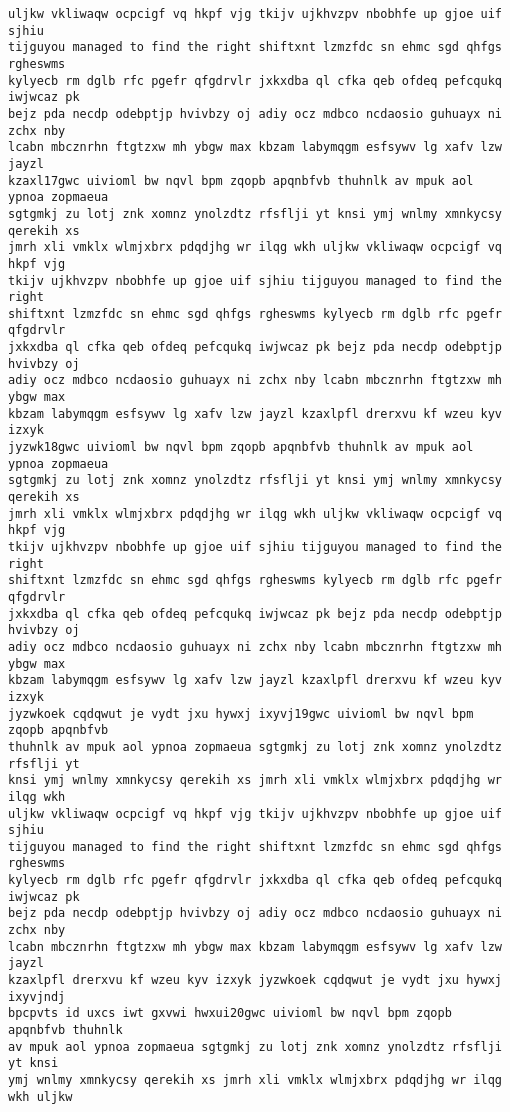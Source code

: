 \documentclass[11pt]{article}
\begin{document}
\begin{tcolorbox}[breakable, size=fbox, boxrule=.5pt, pad at break*=1mm, opacityfill=0]
\begin{Verbatim}[commandchars=\\\{\}]
uljkw vkliwaqw ocpcigf vq hkpf vjg tkijv ujkhvzpv nbobhfe up gjoe uif sjhiu
tijguyou managed to find the right shiftxnt lzmzfdc sn ehmc sgd qhfgs rgheswms
kylyecb rm dglb rfc pgefr qfgdrvlr jxkxdba ql cfka qeb ofdeq pefcqukq iwjwcaz pk
bejz pda necdp odebptjp hvivbzy oj adiy ocz mdbco ncdaosio guhuayx ni zchx nby
lcabn mbcznrhn ftgtzxw mh ybgw max kbzam labymqgm esfsywv lg xafv lzw jayzl
kzaxl17gwc uivioml bw nqvl bpm zqopb apqnbfvb thuhnlk av mpuk aol ypnoa zopmaeua
sgtgmkj zu lotj znk xomnz ynolzdtz rfsflji yt knsi ymj wnlmy xmnkycsy qerekih xs
jmrh xli vmklx wlmjxbrx pdqdjhg wr ilqg wkh uljkw vkliwaqw ocpcigf vq hkpf vjg
tkijv ujkhvzpv nbobhfe up gjoe uif sjhiu tijguyou managed to find the right
shiftxnt lzmzfdc sn ehmc sgd qhfgs rgheswms kylyecb rm dglb rfc pgefr qfgdrvlr
jxkxdba ql cfka qeb ofdeq pefcqukq iwjwcaz pk bejz pda necdp odebptjp hvivbzy oj
adiy ocz mdbco ncdaosio guhuayx ni zchx nby lcabn mbcznrhn ftgtzxw mh ybgw max
kbzam labymqgm esfsywv lg xafv lzw jayzl kzaxlpfl drerxvu kf wzeu kyv izxyk
jyzwk18gwc uivioml bw nqvl bpm zqopb apqnbfvb thuhnlk av mpuk aol ypnoa zopmaeua
sgtgmkj zu lotj znk xomnz ynolzdtz rfsflji yt knsi ymj wnlmy xmnkycsy qerekih xs
jmrh xli vmklx wlmjxbrx pdqdjhg wr ilqg wkh uljkw vkliwaqw ocpcigf vq hkpf vjg
tkijv ujkhvzpv nbobhfe up gjoe uif sjhiu tijguyou managed to find the right
shiftxnt lzmzfdc sn ehmc sgd qhfgs rgheswms kylyecb rm dglb rfc pgefr qfgdrvlr
jxkxdba ql cfka qeb ofdeq pefcqukq iwjwcaz pk bejz pda necdp odebptjp hvivbzy oj
adiy ocz mdbco ncdaosio guhuayx ni zchx nby lcabn mbcznrhn ftgtzxw mh ybgw max
kbzam labymqgm esfsywv lg xafv lzw jayzl kzaxlpfl drerxvu kf wzeu kyv izxyk
jyzwkoek cqdqwut je vydt jxu hywxj ixyvj19gwc uivioml bw nqvl bpm zqopb apqnbfvb
thuhnlk av mpuk aol ypnoa zopmaeua sgtgmkj zu lotj znk xomnz ynolzdtz rfsflji yt
knsi ymj wnlmy xmnkycsy qerekih xs jmrh xli vmklx wlmjxbrx pdqdjhg wr ilqg wkh
uljkw vkliwaqw ocpcigf vq hkpf vjg tkijv ujkhvzpv nbobhfe up gjoe uif sjhiu
tijguyou managed to find the right shiftxnt lzmzfdc sn ehmc sgd qhfgs rgheswms
kylyecb rm dglb rfc pgefr qfgdrvlr jxkxdba ql cfka qeb ofdeq pefcqukq iwjwcaz pk
bejz pda necdp odebptjp hvivbzy oj adiy ocz mdbco ncdaosio guhuayx ni zchx nby
lcabn mbcznrhn ftgtzxw mh ybgw max kbzam labymqgm esfsywv lg xafv lzw jayzl
kzaxlpfl drerxvu kf wzeu kyv izxyk jyzwkoek cqdqwut je vydt jxu hywxj ixyvjndj
bpcpvts id uxcs iwt gxvwi hwxui20gwc uivioml bw nqvl bpm zqopb apqnbfvb thuhnlk
av mpuk aol ypnoa zopmaeua sgtgmkj zu lotj znk xomnz ynolzdtz rfsflji yt knsi
ymj wnlmy xmnkycsy qerekih xs jmrh xli vmklx wlmjxbrx pdqdjhg wr ilqg wkh uljkw

\end{Verbatim}
\end{tcolorbox}
\end{document}
